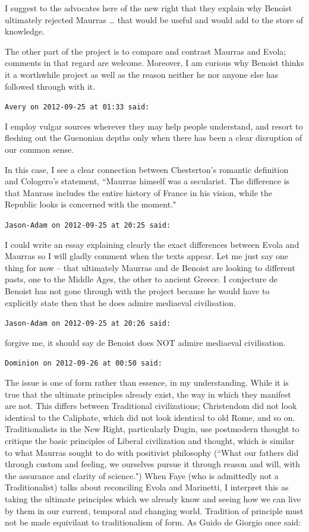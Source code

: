 \begin{footnotesize}
\begin{sffamily}
I suggest to the advocates here of the new right that they explain why Benoist ultimately rejected Maurras … that would be useful and would add to the store of knowledge.

The other part of the project is to compare and contrast Maurras and Evola; comments in that regard are welcome. Moreover, I am curious why Benoist thinks it a worthwhile project as well as the reason neither he nor anyone else has followed through with it.


\hfill

\texttt{Avery on 2012-09-25 at 01:33 said: }

I employ vulgar sources wherever they may help people understand, and resort to fleshing out the Guenonian depths only when there has been a clear disruption of our common sense.

In this case, I see a clear connection between Chesterton's romantic definition and Cologero's statement, ``Maurras himself was a secularist. The difference is that Maurass includes the entire history of France in his vision, while the Republic looks is concerned with the moment."


\hfill

\texttt{Jason-Adam on 2012-09-25 at 20:25 said: }

I could write an essay explaining clearly the exact differences between Evola and Maurras so I will gladly comment when the texts appear. Let me just say one thing for now – that ultimately Maurras and de Benoist are looking to different pasts, one to the Middle Ages, the other to ancient Greece. I conjecture de Benoist has not gone through with the project because he would have to explicitly state then that he does admire mediaeval civilisation.


\hfill

\texttt{Jason-Adam on 2012-09-25 at 20:26 said: }

forgive me, it should say de Benoist does NOT admire mediaeval civilisation.


\hfill

\texttt{Dominion on 2012-09-26 at 00:50 said: }

The issue is one of form rather than essence, in my understanding. While it is true that the ultimate principles already exist, the way in which they manifest are not. This differs between Traditional civilizations; Christendom did not look identical to the Caliphate, which did not look identical to old Rome, and so on. Traditionalists in the New Right, particularly Dugin, use postmodern thought to critique the basic principles of Liberal civilization and thought, which is similar to what Maurras sought to do with positivist philosophy (``What our fathers did through custom and feeling, we ourselves pursue it through reason and will, with the assurance and clarity of science.") When Faye (who is admittedly not a Traditionalist) talks about reconciling Evola and Marinetti, I interpret this as taking the ultimate principles which we already know and seeing how we can live by them in our current, temporal and changing world. Tradition of principle must not be made equivilant to traditionalism of form. As Guido de Giorgio once said:


\end{sffamily}
\end{footnotesize}
